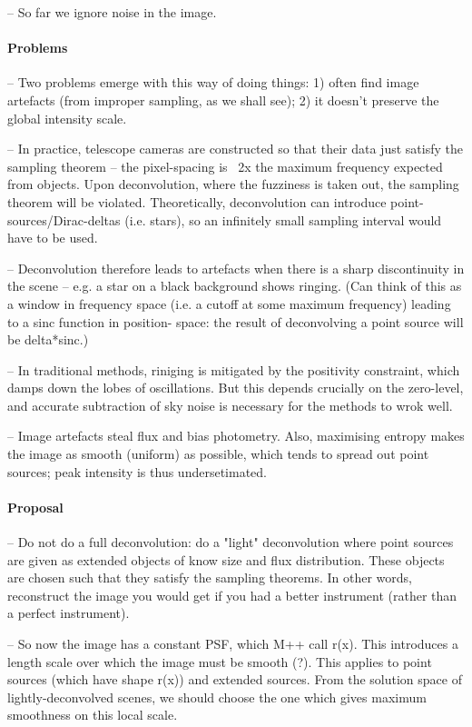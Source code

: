 \documentclass[letterpaper, 11pt]{article}
\begin{document}
-- So far we ignore noise in the image.

\paragraph{Problems}

-- Two problems emerge with this way of doing things: 1) often find image artefacts (from improper sampling, as we shall see); 2) it doesn't 
preserve the global intensity scale.

-- In practice, telescope cameras are constructed so that their data just satisfy the sampling theorem -- the pixel-spacing is ~2x the maximum 
frequency expected from objects. Upon deconvolution, where the fuzziness is taken out, the sampling theorem will be violated. Theoretically, 
deconvolution can introduce point-sources/Dirac-deltas (i.e. stars), so an infinitely small sampling interval would have to be used.

-- Deconvolution therefore leads to artefacts when there is a sharp discontinuity in the scene -- e.g. a star on a black background shows 
ringing. (Can think of this as a window in frequency space (i.e. a cutoff at some maximum frequency) leading to a sinc function in position-
space: the result of deconvolving a point source will be delta*sinc.)

-- In traditional methods, riniging is mitigated by the positivity 
constraint, which damps down the lobes of oscillations. But this depends crucially on the zero-level, and accurate subtraction of sky noise 
is necessary for the methods to wrok well.

-- Image artefacts steal flux and bias photometry. Also, maximising entropy makes the image as 
smooth (uniform) as possible, which tends to spread out point sources; peak intensity is thus undersetimated.


\paragraph{Proposal}

-- Do not do a full deconvolution: do a "light" deconvolution where point sources are given as extended objects of know size and flux 
distribution. These objects are chosen such that they satisfy the sampling theorems. In other words, reconstruct the image you would get if 
you had a better instrument (rather than a perfect instrument).

-- So now the image has a constant PSF, which M++ call r(x). This introduces a length scale over which the image must be smooth (?). This 
applies to point sources (which have shape r(x)) and extended sources. From the solution space of lightly-deconvolved scenes, we should 
choose the one which gives maximum smoothness on this local scale.
\end{document}
